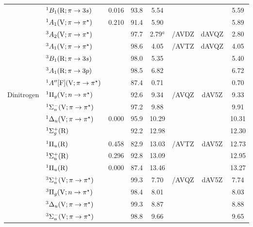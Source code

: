 \begin{tabular}{llcccccc}
                        &$^1B_1 (\mathrm{R};\pi \rightarrow 3s)$ 						& 0.016	&93.8 &5.54		&			&			&5.59 	\\
                        &$^1A_1 (\mathrm{V};\pi \rightarrow \pi^\star)$				& 0.210	&91.4 &5.90		&			&			& 5.89	 \\
                        &$^3A_2 (\mathrm{V};\pi \rightarrow \pi^\star)$ 				&		&97.7 &2.79$^a$	& {\exCI}/AVDZ & dAVQZ		&2.80	\\
                        &$^3A_1 (\mathrm{V};\pi \rightarrow \pi^\star)$				&		&98.6 &4.05		& {\exCI}/AVTZ & dAVQZ		&4.05	\\
                        &$^3B_1 (\mathrm{R};\pi \rightarrow 3s)$ 						&		&98.0 &5.35		&			&			&5.40 	\\
                        &$^3A_1 (\mathrm{R};\pi \rightarrow 3p)$						&		&98.5 &6.82		&			&			&6.72 	\\
                        &$^1A^{\prime\prime} [\mathrm{F}]	(\mathrm{V};\pi \rightarrow \pi^\star)$		&		&87.4 &0.71		& 			 & 			& 0.70 	\\
      Dinitrogen		&$^1\Pi_g (\mathrm{V};n \rightarrow \pi^\star)$ 				&		&92.6 &9.34		& {\exCI}/AVQZ&dAV5Z		&9.33	 \\
                        &$^1\Sigma_u^- (\mathrm{V};\pi \rightarrow \pi^\star)$			&		&97.2 &9.88		&			&			&9.91	 \\
                        &$^1\Delta_u (\mathrm{V};\pi \rightarrow \pi^\star)$ 				& 0.000	&95.9 &10.29		&			&			&10.31	 \\
                        &$^1\Sigma_g^+ (\mathrm{R})$ 								&		&92.2 &12.98		&			&			&12.30	 \\
                        &$^1\Pi_u (\mathrm{R})$ 									& 0.458	&82.9 &13.03		& {\exCI}/AVTZ&dAV5Z		&12.73	 \\
                        &$^1\Sigma_u^+ (\mathrm{R})$ 								& 0.296	&92.8 &13.09		&			&			&12.95	 \\
                        &$^1\Pi_u (\mathrm{R})$ 									& 0.000	&87.4 &13.46		&			&			&13.27	 \\
                        &$^3\Sigma_u^+ (\mathrm{V};\pi \rightarrow \pi^\star)$			&		&99.3 &7.70		& {\exCI}/AVQZ&dAV5Z		&7.74	 \\
                        &$^3\Pi_g (\mathrm{V};n \rightarrow \pi^\star)$ 				&		&98.4 &8.01		&			&			&8.03	 \\
                        &$^3\Delta_u (\mathrm{V};\pi \rightarrow \pi^\star)$ 				&		&99.3 &8.87		&			&			&8.88	 \\
                        &$^3\Sigma_u^- (\mathrm{V};\pi \rightarrow \pi^\star)$			&		&98.8 &9.66		&			&			&9.65	 \\

\end{tabular}
